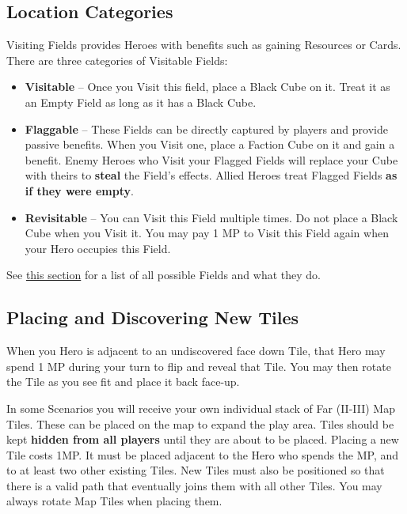 \begin{multicols}{2}

\subsection*{\hypertarget{Categories}{Location Categories}}
Visiting Fields provides Heroes with benefits such as gaining Resources or Cards.
There are three categories of Visitable Fields:
\begin{itemize}
  \item \textbf{Visitable} – Once you Visit this field, place a Black Cube on it.
    Treat it as an Empty Field as long as it has a Black Cube.
  \item \textbf{Flaggable} – These Fields can be directly captured by players and provide passive benefits.
    When you Visit one, place a Faction Cube on it and gain a benefit.
    Enemy Heroes who Visit your Flagged Fields will replace your Cube with theirs to \textbf{steal} the Field’s effects.
    Allied Heroes treat Flagged Fields \textbf{as if they were empty}.
  \item \textbf{Revisitable} – You can Visit this Field multiple times.
    Do not place a Black Cube when you Visit it.
    You may pay 1 MP to Visit this Field again when your Hero occupies this Field.
\end{itemize}

See \hyperlink{All}{this section} for a list of all possible Fields and what they do.
\subsection*{\hypertarget{Placing}{Placing and Discovering New Tiles}}
When you Hero is adjacent to an undiscovered face down Tile, that Hero may spend 1 MP during your turn to flip and reveal that Tile.
You may then rotate the Tile as you see fit and place it back face-up.\par
In some Scenarios you will receive your own individual stack of Far (II-III) Map Tiles.
These can be placed on the map to expand the play area.
Tiles should be kept \textbf{hidden from all players} until they are about to be placed.
Placing a new Tile costs 1MP.
It must be placed adjacent to the Hero who spends the MP, and to at least two other existing Tiles.
New Tiles must also be positioned so that there is a valid path that eventually joins them with all other Tiles.
You may always rotate Map Tiles when placing them.\par

\end{multicols}

